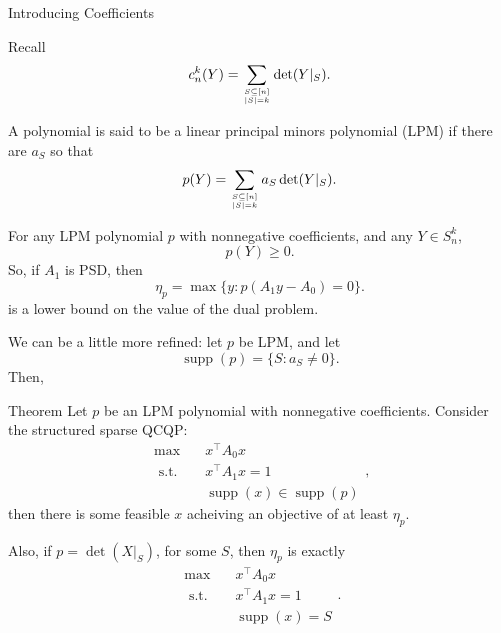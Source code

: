 \documentclass{beamer}
\DeclareMathOperator*{\supp}{supp}
\newcommand{\st}{{\text{ s.t. }}}
\renewcommand\top[2]{\genfrac{}{}{0pt}{}{#1}{#2}}
\begin{document}
\begin{frame}
    \centering
    \huge
    {\color{gray}Introducing Coefficients}
\end{frame}
\begin{frame}
    Recall
    \[
        c_n^k(Y) = \sum_{\top{S \subseteq [n]}{|S| = k}}  \det(Y|_S).
    \]
\end{frame}
\begin{frame}
    A polynomial is said to be a linear principal minors polynomial (LPM) if there are $a_S$ so that
    \[
        p(Y) = \sum_{\top{S \subseteq [n]}{|S| = k}} a_S \det(Y|_S).
    \]
\end{frame}
\begin{frame}
    For any LPM polynomial $p$ with nonnegative coefficients, and any $Y \in S^k_n$, 
    \[
        p(Y) \ge 0.
    \]
    \pause
    So, if $A_1$ is PSD, then 
    \[
        \eta_p = \max \{y : p(A_1y-A_0) = 0 \}.
    \]
    is a lower bound on the value of the dual problem.
\end{frame}
\begin{frame}
    We can be a little more refined: let $p$ be LPM, and let 
    \[
        \supp(p) = \{S : a_S \neq 0\}.
    \]
    \pause
    Then,
    \begin{block}{Theorem}
        Let $p$ be an LPM polynomial with nonnegative coefficients.
        Consider the structured sparse QCQP:
        \begin{equation*}
            \begin{aligned}
                \max\quad & x^{\intercal}A_0x\\
                \st & x^{\intercal}A_1x = 1\\
                    & \supp(x) \in \supp(p)
            \end{aligned},
        \end{equation*}
        then there is some feasible $x$ acheiving an objective of at least $\eta_p$.
    \end{block}
\end{frame}
\begin{frame}
    Also, if $p = \det(X|_S)$, for some $S$, then $\eta_p$ is exactly
    \begin{equation*}
        \begin{aligned}
            \max\quad & x^{\intercal}A_0x\\
            \st & x^{\intercal}A_1x = 1\\
                & \supp(x) = S
        \end{aligned}.
    \end{equation*}
\end{frame}
\end{document}
